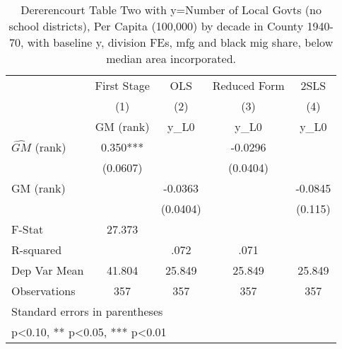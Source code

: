 \begin{table}[htbp]\centering
\def\sym#1{\ifmmode^{#1}\else\(^{#1}\)\fi}
\caption{Dererencourt Table Two with y=Number of Local Govts (no school districts), Per Capita (100,000) by decade in County 1940-70, with baseline y, division FEs, mfg and black mig share, below median area incorporated.}
\begin{tabular}{l*{4}{c}}
\toprule
                    & First Stage   &         OLS   &Reduced Form   &        2SLS   \\
                    &\multicolumn{1}{c}{(1)}&\multicolumn{1}{c}{(2)}&\multicolumn{1}{c}{(3)}&\multicolumn{1}{c}{(4)}\\
                    &\multicolumn{1}{c}{GM  (rank)}&\multicolumn{1}{c}{y\_L0}&\multicolumn{1}{c}{y\_L0}&\multicolumn{1}{c}{y\_L0}\\
\midrule
$\hat{GM}$ (rank)   &       0.350***&               &     -0.0296   &               \\
                    &    (0.0607)   &               &    (0.0404)   &               \\
\addlinespace
GM  (rank)          &               &     -0.0363   &               &     -0.0845   \\
                    &               &    (0.0404)   &               &     (0.115)   \\
\midrule
F-Stat              &      27.373   &               &               &               \\
R-squared           &               &        .072   &        .071   &               \\
Dep Var Mean        &      41.804   &      25.849   &      25.849   &      25.849   \\
Observations        &         357   &         357   &         357   &         357   \\
\bottomrule
\multicolumn{5}{l}{\footnotesize Standard errors in parentheses}\\
\multicolumn{5}{l}{\footnotesize * p<0.10, ** p<0.05, *** p<0.01}\\
\end{tabular}
\end{table}
